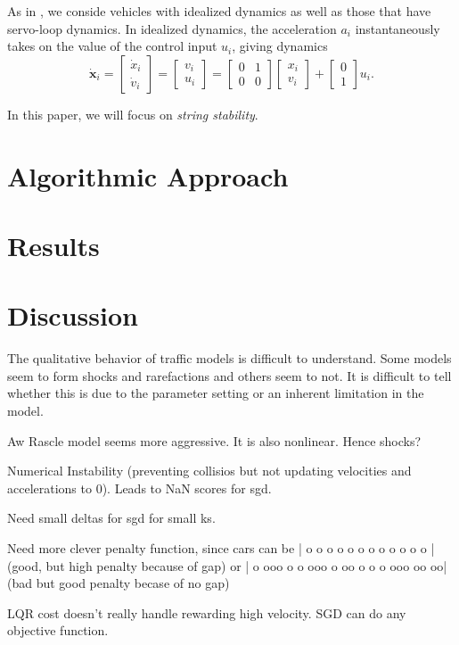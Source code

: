 \documentclass[11pt]{article}
\newcommand{\mb}{\mathbf}
\begin{document}
\begin{multicols}{2}
As in \cite{Peng}, we conside vehicles with idealized dynamics as well as those that have servo-loop dynamics. In idealized dynamics, the acceleration $a_i$ instantaneously takes on the value of the control input $u_i$, giving dynamics
\[\dot{\mb x}_i = \left[\begin{array}{c} \dot{x}_i\\ \dot{v}_i \end{array} \right] = \left[\begin{array}{c} v_i\\ u_i \end{array} \right] =  \left[\begin{array}{cc} 0 & 1\\ 0 & 0 \end{array} \right] \left[\begin{array}{c} x_i\\ v_i \end{array} \right] +  \left[\begin{array}{c} 0\\ 1 \end{array} \right]u_i. \]

In this paper, we will focus on {\em string stability}.

\section{Algorithmic Approach}

\section{Results}

\section{Discussion}  

The qualitative behavior of traffic models is difficult to understand. Some models seem to form shocks and rarefactions and others seem to not. It is difficult to tell whether this is due to the parameter setting or an inherent limitation in the model.

Aw Rascle model seems more aggressive. It is also nonlinear. Hence shocks?

Numerical Instability (preventing collisios but not updating velocities and accelerations to 0). Leads to NaN scores for sgd.

Need small deltas for sgd for small ks.

Need more clever penalty function, since cars can be | o o o o o o o o o           o o o | (good, but high penalty because of gap) or | o ooo o o ooo o oo o o o ooo oo  oo| (bad but good penalty becase of no gap)

LQR cost doesn't really handle rewarding high velocity. SGD can do any objective function.

\end{multicols}
\end{document}
